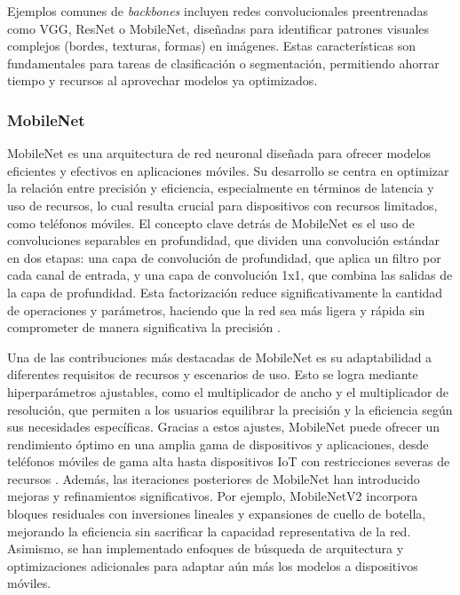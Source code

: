 Ejemplos comunes de \textit{backbones} incluyen redes convolucionales preentrenadas como VGG, ResNet o MobileNet, diseñadas para identificar patrones visuales complejos (bordes, texturas, formas) en imágenes. Estas características son fundamentales para tareas de clasificación o segmentación, permitiendo ahorrar tiempo y recursos al aprovechar modelos ya optimizados.

\subsubsection{MobileNet}

MobileNet \cite{howard2017} es una arquitectura de red neuronal diseñada para ofrecer modelos eficientes y efectivos en aplicaciones móviles. Su desarrollo se centra en optimizar la relación entre precisión y eficiencia, especialmente en términos de latencia y uso de recursos, lo cual resulta crucial para dispositivos con recursos limitados, como teléfonos móviles. El concepto clave detrás de MobileNet es el uso de convoluciones separables en profundidad, que dividen una convolución estándar en dos etapas: una capa de convolución de profundidad, que aplica un filtro por cada canal de entrada, y una capa de convolución 1x1, que combina las salidas de la capa de profundidad. Esta factorización reduce significativamente la cantidad de operaciones y parámetros, haciendo que la red sea más ligera y rápida sin comprometer de manera significativa la precisión \cite{elharrouss2022}.

Una de las contribuciones más destacadas de MobileNet es su adaptabilidad a diferentes requisitos de recursos y escenarios de uso. Esto se logra mediante hiperparámetros ajustables, como el multiplicador de ancho y el multiplicador de resolución, que permiten a los usuarios equilibrar la precisión y la eficiencia según sus necesidades específicas. Gracias a estos ajustes, MobileNet puede ofrecer un rendimiento óptimo en una amplia gama de dispositivos y aplicaciones, desde teléfonos móviles de gama alta hasta dispositivos IoT con restricciones severas de recursos \cite{elharrouss2022}. Además, las iteraciones posteriores de MobileNet han introducido mejoras y refinamientos significativos. Por ejemplo, MobileNetV2 incorpora bloques residuales con inversiones lineales y expansiones de cuello de botella, mejorando la eficiencia sin sacrificar la capacidad representativa de la red. Asimismo, se han implementado enfoques de búsqueda de arquitectura y optimizaciones adicionales para adaptar aún más los modelos a dispositivos móviles.

